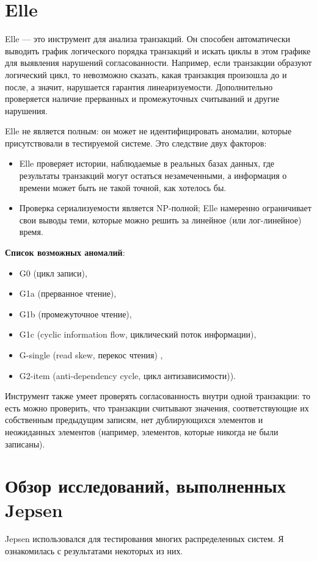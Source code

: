 \documentclass[12pt,  openany]{book}
\begin{document}
\section{Elle}
\par
Elle --- это инструмент для анализа транзакций. Он способен автоматически выводить график логического порядка транзакций и искать циклы в этом графике для выявления нарушений согласованности. Например, если транзакции образуют логический цикл, то невозможно сказать, какая транзакция произошла до и после, а значит, нарушается гарантия линеаризуемости. 
Дополнительно проверяется наличие прерванных и промежуточных считываний и другие нарушения.
\par
Elle не является полным: он может не идентифицировать аномалии, которые присутствовали в тестируемой системе. Это следствие двух факторов:
\begin{itemize}
\item Elle проверяет истории, наблюдаемые в реальных базах данных, где результаты транзакций могут остаться незамеченными, а информация о времени может быть не такой точной, как хотелось бы.
\item Проверка сериализуемости является NP-полной; Elle намеренно ограничивает свои выводы теми, которые можно решить за линейное (или лог-линейное) время.
\end{itemize}
\par
\textbf{Список возможных аномалий}:
\begin{itemize}
\item G0 (цикл записи), 
\item G1a (прерванное чтение), 
\item G1b (промежуточное чтение), 
\item G1c (cyclic information flow, циклический поток информации), 
\item G-single (read skew, перекос чтения) ,
\item G2-item (anti-dependency cycle, цикл антизависимости)).
\end{itemize}
Инструмент также умеет проверять согласованность внутри одной транзакции: то есть можно проверить, что транзакции считывают значения, соответствующие их собственным предыдущим записям, нет дублирующихся элементов и неожиданных элементов (например, элементов, которые никогда не были записаны).
\section{Обзор исследований, выполненных Jepsen}
Jepsen использовался для тестирования многих распределенных систем. 
Я ознакомилась с результатами некоторых из них.
\end{document}
